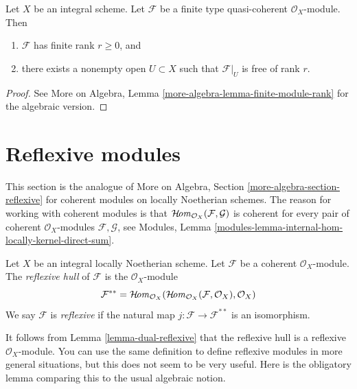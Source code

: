 \begin{lemma}
\label{lemma-finite-module-rank}
Let $X$ be an integral scheme. Let $\mathcal{F}$ be a finite type
quasi-coherent $\mathcal{O}_X$-module. Then
\begin{enumerate}
\item $\mathcal{F}$ has finite rank $r \geq 0$, and
\item there exists a nonempty open $U \subset X$
such that $\mathcal{F}|_U$ is free of rank $r$.
\end{enumerate}
\end{lemma}

\begin{proof}
See More on Algebra, Lemma \ref{more-algebra-lemma-finite-module-rank}
for the algebraic version.
\end{proof}











\section{Reflexive modules}
\label{section-reflexive}

\noindent
This section is the analogue of
More on Algebra, Section \ref{more-algebra-section-reflexive}
for coherent modules on locally Noetherian schemes. The reason for
working with coherent modules is that
$\mathop{\mathcal{H}\!\mathit{om}}\nolimits_{\mathcal{O}_X}(\mathcal{F}, \mathcal{G})$ is coherent
for every pair of coherent $\mathcal{O}_X$-modules $\mathcal{F}, \mathcal{G}$,
see Modules, Lemma \ref{modules-lemma-internal-hom-locally-kernel-direct-sum}.

\begin{definition}
\label{definition-reflexive}
Let $X$ be an integral locally Noetherian scheme. Let $\mathcal{F}$
be a coherent $\mathcal{O}_X$-module. The {\it reflexive hull}
of $\mathcal{F}$ is the $\mathcal{O}_X$-module
$$
\mathcal{F}^{**} = \mathop{\mathcal{H}\!\mathit{om}}\nolimits_{\mathcal{O}_X}(
\mathop{\mathcal{H}\!\mathit{om}}\nolimits_{\mathcal{O}_X}(\mathcal{F}, \mathcal{O}_X), \mathcal{O}_X)
$$
We say $\mathcal{F}$ is {\it reflexive} if the natural map
$j : \mathcal{F} \longrightarrow \mathcal{F}^{**}$
is an isomorphism.
\end{definition}

\noindent
It follows from Lemma \ref{lemma-dual-reflexive} that the reflexive hull
is a reflexive $\mathcal{O}_X$-module.
You can use the same definition to define reflexive modules in more
general situations, but this does not seem to be very useful.
Here is the obligatory lemma comparing this to the usual algebraic notion.

